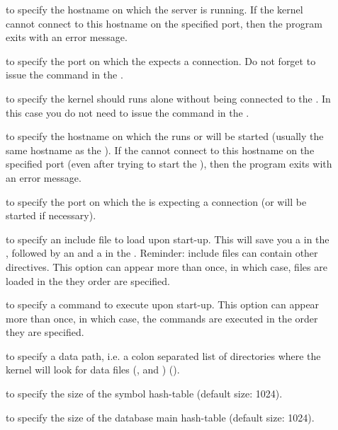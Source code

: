 \begin{description}

\item[] to specify the hostname on which the server is running.  If
the kernel cannot connect to this hostname on the specified port, then the
program exits with an error message.

\item[] to specify the port on which the \OPRSS{} expects a
connection. Do not forget to issue the  command in the
\OPRSS{}.

\item[] to specify the kernel should runs alone without being
connected to the \OPRSS{}. In this case you do not need to issue the
 command in the \OPRSS{}.

\item[] to specify the hostname on which the \MPA{} runs or will be
started (usually the same hostname as the \OPRSS{}). If the \CPK{}
cannot connect to this hostname on the specified port (even after trying to
start the \MPA{}), then the program exits with an error message.

\item[] to specify the port on which the \MPA{} is expecting a
connection (or will be started if necessary).

\item[] to specify an include file to load upon start-up. This will
  save you a  in the \OPRSS{}, followed by an 
  and a  in the \CPK{}. Reminder: include files can contain
  other  directives. This option can appear more than once, in
  which case, files are loaded in the they order are specified.
  
\item[] to specify a command to execute upon start-up. This option
  can appear more than once, in which case, the commands are executed in the
  order they are specified.

\item[] to specify a data path, i.e. a colon separated list of
directories where the kernel will look for data files (,
 and ) ().

\item[] to specify the size of the symbol hash-table (default size:
1024).

\item[] to specify the size of the database main hash-table
(default size: 1024).


\end{description}
